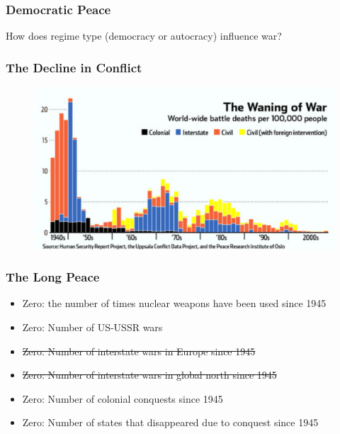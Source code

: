 \documentclass{beamer}
\begin{document}

\begin{frame} 
\frametitle{\LARGE{Democratic Peace}}
\centering 
\Large{
	How does regime type (democracy or autocracy) influence war? 
}
\end{frame}

\begin{frame} 
\frametitle{\LARGE{The Decline in Conflict}}
\begin{figure}[ht!]
	\centering
	\includegraphics[width=\textwidth,height=0.8\textheight,keepaspectratio]{./waning_war.png}
\end{figure}
\end{frame}

\begin{frame} 
\frametitle{\LARGE{The Long Peace}}
\begin{itemize}
		\item Zero: the number of times nuclear weapons have been used since 1945 \pause

		\item Zero: Number of US-USSR wars \pause

		\item \st{Zero: Number of interstate wars in Europe since 1945}

		\item \st{Zero: Number of interstate wars in global north since 1945}
\pause

		\item Zero: Number of colonial conquests since 1945
\pause

		\item Zero: Number of states that disappeared due to conquest since 1945
\end{itemize}
\end{frame}
\end{document}
